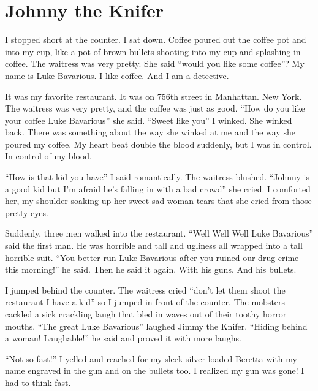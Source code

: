 \chapter{Johnny the Knifer}



I stopped short at the counter. I sat down. Coffee poured out the
coffee pot and into my cup, like a pot of brown bullets shooting
into my cup and splashing in coffee. The waitress was very pretty.
She said ``would you like some coffee''? My name is Luke Bavarious. I
like coffee. And I am a detective.



It was my favorite restaurant. It was on 756th street in Manhattan.
New York. The waitress was very pretty, and the coffee was just as
good. ``How do you like your coffee Luke Bavarious'' she said. ``Sweet
like you'' I winked. She winked back. There was something about the
way she winked at me and the way she poured my coffee. My heart
beat double the blood suddenly, but I was in control. In control of
my blood.



``How is that kid you have'' I said romantically. The waitress
blushed. ``Johnny is a good kid but I'm afraid he's falling in with
a bad crowd'' she cried. I comforted her, my shoulder soaking up her
sweet sad woman tears that she cried from those pretty eyes.



Suddenly, three men walked into the restaurant. ``Well Well Well
Luke Bavarious'' said the first man. He was horrible and tall and
ugliness all wrapped into a tall horrible suit. ``You better run
Luke Bavarious after you ruined our drug crime this morning!'' he
said. Then he said it again. With his guns. And his bullets.



I jumped behind the counter. The waitress cried ``don't let them
shoot the restaurant I have a kid'' so I jumped in front of the
counter. The mobsters cackled a sick crackling laugh that bled in
waves out of their toothy horror mouths. ``The great Luke Bavarious''
laughed Jimmy the Knifer. ``Hiding behind a woman! Laughable!'' he
said and proved it with more laughs.



``Not so fast!'' I yelled and reached for my sleek silver loaded
Beretta with my name engraved in the gun and on the bullets too. I
realized my gun was gone! I had to think fast.



